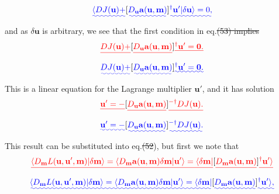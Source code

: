 \documentclass[a4paper,12pt]{paper}
\providecommand{\DIFadd}[1]{{\protect\color{blue}\uwave{#1}}} %
\providecommand{\DIFdel}[1]{{\protect\color{red}\sout{#1}}}                      %
\providecommand{\DIFaddbegin}{} %
\providecommand{\DIFaddend}{} %
\providecommand{\DIFdelbegin}{} %
\providecommand{\DIFdelend}{} %
\begin{document}
\DIFdelend \DIFaddbegin \begin{equation}
\DIFadd{\langle DJ(\mathbf{u})+}[\DIFadd{D_{\mathbf{u}}\mathbf{a}(\mathbf{u},\mathbf{m})}]\DIFadd{^{\dagger}\mathbf{u}'|\delta \mathbf{u}\rangle=0,
\label{eq:59}
}\end{equation}\DIFaddend 
and as $\delta \mathbf{u}$ is arbitrary, we see that the first condition in eq.\DIFdelbegin \DIFdel{(53) implies
}\begin{displaymath}
\DIFdel{DJ(\mathbf{u})+}[\DIFdel{D_{\mathbf{u}}\mathbf{a}(\mathbf{u},\mathbf{m})}]\DIFdel{^{\dagger}\mathbf{u}'=\mathbf{0}.
}\end{displaymath}%
\DIFdelend \DIFaddbegin \DIFadd{~(\ref{eq:57}) implies
}\begin{equation}
\DIFadd{DJ(\mathbf{u})+}[\DIFadd{D_{\mathbf{u}}\mathbf{a}(\mathbf{u},\mathbf{m})}]\DIFadd{^{\dagger}\mathbf{u}'=\mathbf{0}.
\label{eq:60}
}\end{equation}\DIFaddend 
This is a linear equation for the Lagrange multiplier $\mathbf{u}'$, and it has solution
\DIFdelbegin \begin{displaymath}
\DIFdel{\mathbf{u}'=-}[\DIFdel{D_{\mathbf{u}}\mathbf{a}(\mathbf{u},\mathbf{m})}]\DIFdel{^{-\dagger}DJ(\mathbf{u}).
}\end{displaymath}%
\DIFdelend \DIFaddbegin \begin{equation}
\DIFadd{\mathbf{u}'=-}[\DIFadd{D_{\mathbf{u}}\mathbf{a}(\mathbf{u},\mathbf{m})}]\DIFadd{^{-\dagger}DJ(\mathbf{u}).
\label{eq:61}
}\end{equation}\DIFaddend 
This result can be substituted into eq.\DIFdelbegin \DIFdel{(52}\DIFdelend \DIFaddbegin \DIFadd{~(\ref{eq:56}}\DIFaddend ), but first we note that
\DIFdelbegin \begin{displaymath}
\DIFdel{\langle D_{\mathbf{m}}L(\mathbf{u},\mathbf{u}',\mathbf{m})|\delta \mathbf{m}\rangle=\langle D_{\mathbf{m}}\mathbf{a}(\mathbf{u},\mathbf{m})\delta \mathbf{m}|\mathbf{u}'\rangle=\langle\delta \mathbf{m}|}[\DIFdel{D_{\mathbf{m}}\mathbf{a}(\mathbf{u},\mathbf{m})}]\DIFdel{^{\dagger}\mathbf{u}'\rangle
}\end{displaymath}%
\DIFdelend \DIFaddbegin \begin{equation}
\DIFadd{\langle D_{\mathbf{m}}L(\mathbf{u},\mathbf{u}',\mathbf{m})|\delta \mathbf{m}\rangle=\langle D_{\mathbf{m}}\mathbf{a}(\mathbf{u},\mathbf{m})\delta \mathbf{m}|\mathbf{u}'\rangle=\langle\delta \mathbf{m}|}[\DIFadd{D_{\mathbf{m}}\mathbf{a}(\mathbf{u},\mathbf{m})}]\DIFadd{^{\dagger}\mathbf{u}'\rangle,
\label{eq:62}
}\end{equation}\DIFaddend 
\end{document}

